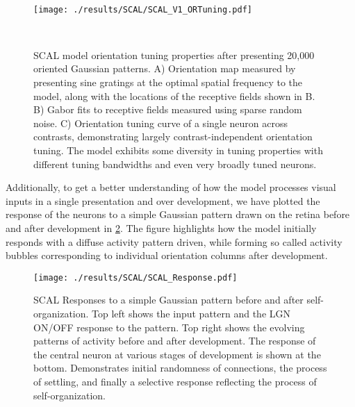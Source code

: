 \begin{figure}
  \begin{minipage}[t]{0.67\textwidth}
    \mbox{}\\[-\baselineskip]
    \texttt{[image: ./results/SCAL/SCAL\_V1\_ORTuning.pdf]}
  \end{minipage}\hfill
  \begin{minipage}[t]{0.3\textwidth}
    \mbox{}\\[-\baselineskip]
    \caption[Orientation tuning properties of the SCAL model.]{SCAL
      model orientation tuning properties after presenting 20,000
      oriented Gaussian patterns. A) Orientation map measured by
      presenting sine gratings at the optimal spatial frequency to the
      model, along with the locations of the receptive fields shown in
      B. B) Gabor fits to receptive fields measured using sparse
      random noise. C) Orientation tuning curve of a single neuron
      across contrasts, demonstrating largely contrast-independent
      orientation tuning. The model exhibits some diversity in tuning
      properties with different tuning bandwidths and even very
      broadly tuned neurons.}
    \label{SCALORTuning}
  \end{minipage}
\end{figure}

Additionally, to get a better understanding of how the model processes
visual inputs in a single presentation and over development, we have
plotted the response of the neurons to a simple Gaussian pattern drawn
on the retina before and after development in \ref{SCALResponse}. The
figure highlights how the model initially responds with a diffuse
activity pattern driven, while forming so called activity bubbles
corresponding to individual orientation columns after development.

\begin{figure}
	\centering
    \texttt{[image: ./results/SCAL/SCAL\_Response.pdf]}
	\caption[SCAL Responses to a simple Gaussian pattern before and
      after self-organization.]{SCAL Responses to a simple Gaussian
      pattern before and after self-organization. Top left shows the
      input pattern and the LGN ON/OFF response to the pattern. Top
      right shows the evolving patterns of activity before and after
      development. The response of the central neuron at various
      stages of development is shown at the bottom. Demonstrates
      initial randomness of connections, the process of settling, and
      finally a selective response reflecting the process of
      self-organization. }
	\label{SCALResponse}
\end{figure}

